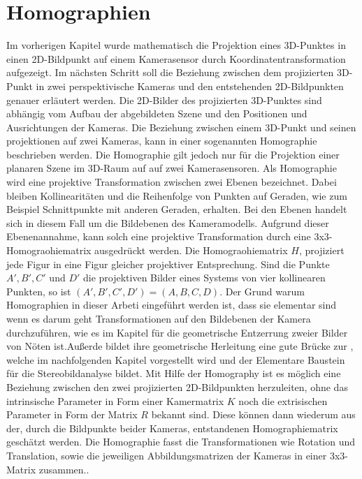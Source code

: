 \chapter{Homographien}
\label{sec:homographien} 

Im vorherigen Kapitel wurde mathematisch die Projektion eines 3D-Punktes in einen 2D-Bildpunkt auf einem Kamerasensor durch Koordinatentransformation aufgezeigt. Im nächsten Schritt soll die Beziehung zwischen dem projizierten 3D-Punkt in zwei perspektivische Kameras und den entstehenden 2D-Bildpunkten genauer erläutert werden. Die 2D-Bilder des projizierten 3D-Punktes sind abhängig vom Aufbau der abgebildeten Szene und den Positionen und Ausrichtungen der Kameras\cite{Elements}. Die Beziehung zwischen einem 3D-Punkt und seinen projektionen auf zwei Kameras, kann in einer sogenannten Homographie beschrieben werden. Die Homographie gilt jedoch nur für die Projektion einer planaren Szene im 3D-Raum auf auf zwei Kamerasensoren. Als Homographie wird eine projektive Transformation zwischen zwei Ebenen bezeichnet. Dabei bleiben Kollinearitäten und die Reihenfolge von Punkten auf Geraden, wie zum Beispiel Schnittpunkte mit anderen Geraden, erhalten. Bei den Ebenen handelt sich in diesem Fall um die Bildebenen des Kameramodells. Aufgrund dieser Ebenenannahme, kann solch eine projektive Transformation durch eine 3x3-Homograohiematrix ausgedrückt werden\cite{Roser}. Die Homograohiematrix $H$, projiziert jede Figur in eine Figur gleicher projektiver Entsprechung\cite{HZ,Elements}. Sind die Punkte $A',B',C'$ und $D'$ die projektiven Bilder eines Systems von vier kollinearen Punkten, so ist $(A',B',C',D') = (A,B,C,D)$\cite{Peiffer}. Der Grund warum Homographien in dieser Arbeti eingeführt werden ist, dass sie elementar sind wenn es darum geht Transformationen auf den Bildebenen der Kamera durchzuführen, wie es im Kapitel  für die geometrische Entzerrung zweier Bilder von Nöten ist.Außerde bildet ihre geometrische Herleitung eine gute Brücke zur , welche im nachfolgenden Kapitel vorgestellt wird und der Elementare Baustein für die Stereobildanalyse bildet. Mit Hilfe der Homography ist es möglich eine Beziehung zwischen den zwei projizierten 2D-Bildpunkten herzuleiten, ohne das intrinsische Parameter in Form einer Kamermatrix $K$ noch die extrisischen Parameter in Form der Matrix $R$ bekannt sind\cite{HZ,Elements}.  Diese können dann wiederum aus der, durch die Bildpunkte beider Kameras, entstandenen Homographiematrix geschätzt werden\cite{HZ}. Die Homographie fasst die Transformationen wie Rotation und Translation, sowie die jeweiligen Abbildungsmatrizen der Kameras in einer 3x3-Matrix zusammen.\cite{Elements,Peiffer}. 



